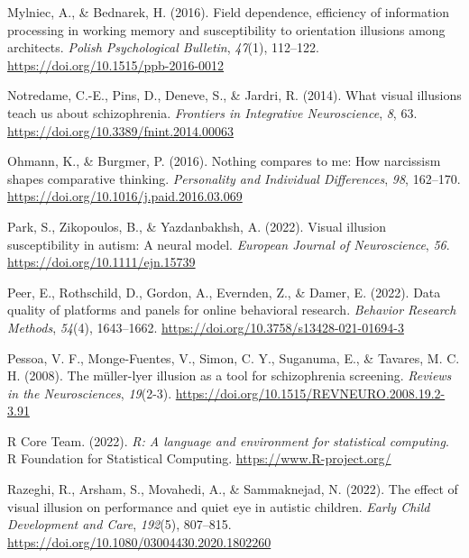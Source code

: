 \documentclass[
  man,floatsintext]{apa6}
\newlength{\cslhangindent}
\newlength{\cslentryspacingunit} %
\newenvironment{CSLReferences}[2] %
 {%
  \setlength{\parindent}{0pt}
  \ifodd #1
  \let\oldpar\par
  \def\par{\hangindent=\cslhangindent\oldpar}
  \fi
  \setlength{\parskip}{#2\cslentryspacingunit}
 }%
 {}
\begin{document}
\begin{CSLReferences}{1}{0}
\leavevmode{}%
Mylniec, A., \& Bednarek, H. (2016). Field dependence, efficiency of information processing in working memory and susceptibility to orientation illusions among architects. \emph{Polish Psychological Bulletin}, \emph{47}(1), 112--122. \url{https://doi.org/10.1515/ppb-2016-0012}

\leavevmode{}%
Notredame, C.-E., Pins, D., Deneve, S., \& Jardri, R. (2014). What visual illusions teach us about schizophrenia. \emph{Frontiers in Integrative Neuroscience}, \emph{8}, 63. \url{https://doi.org/10.3389/fnint.2014.00063}

\leavevmode{}%
Ohmann, K., \& Burgmer, P. (2016). Nothing compares to me: How narcissism shapes comparative thinking. \emph{Personality and Individual Differences}, \emph{98}, 162--170. \url{https://doi.org/10.1016/j.paid.2016.03.069}

\leavevmode{}%
Park, S., Zikopoulos, B., \& Yazdanbakhsh, A. (2022). Visual illusion susceptibility in autism: A neural model. \emph{European Journal of Neuroscience}, \emph{56}. \url{https://doi.org/10.1111/ejn.15739}

\leavevmode{}%
Peer, E., Rothschild, D., Gordon, A., Evernden, Z., \& Damer, E. (2022). Data quality of platforms and panels for online behavioral research. \emph{Behavior Research Methods}, \emph{54}(4), 1643--1662. \url{https://doi.org/10.3758/s13428-021-01694-3}

\leavevmode{}%
Pessoa, V. F., Monge-Fuentes, V., Simon, C. Y., Suganuma, E., \& Tavares, M. C. H. (2008). The müller-lyer illusion as a tool for schizophrenia screening. \emph{Reviews in the Neurosciences}, \emph{19}(2-3). \url{https://doi.org/10.1515/REVNEURO.2008.19.2-3.91}

\leavevmode{}%
R Core Team. (2022). \emph{R: A language and environment for statistical computing}. R Foundation for Statistical Computing. \url{https://www.R-project.org/}

\leavevmode{}%
Razeghi, R., Arsham, S., Movahedi, A., \& Sammaknejad, N. (2022). The effect of visual illusion on performance and quiet eye in autistic children. \emph{Early Child Development and Care}, \emph{192}(5), 807--815. \url{https://doi.org/10.1080/03004430.2020.1802260}


\end{CSLReferences}
\end{document}
